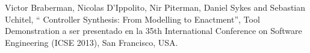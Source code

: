 
\item  Victor Braberman, Nicolas D'Ippolito, Nir Piterman, Daniel
    Sykes and Sebastian Uchitel, `` Controller Synthesis: From Modelling to Enactment'',
    Tool Demonstration a ser presentado en la 35th International Conference on Software Engineering (ICSE
    2013), San Francisco, USA. 
